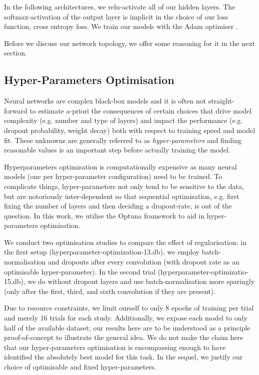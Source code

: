\documentclass[british,12p]{article}
\begin{document}
    In the following architectures, we relu-activate all of our hidden layers. The softmax-activation of the output layer is implicit in the choice of our loss function, cross entropy loss. 
    We train our models with the Adam optimiser \cite{kingma:15}.  
    
    Before we discuss our network topology, we offer some reasoning for it in the next section.

 	
    \subsection{Hyper-Parameters Optimisation}
    
    Neural networks are complex black-box models and it is often not straight-forward to estimate a-priori the consequences of certain choices that drive model complexity (e.g. number and type of layers) and impact the performance (e.g. dropout probability, weight decay) both with respect to training speed and model fit. These unknowns are generally referred to as \textit{hyper-parameters} and finding reasonable values is an important step before actually training the model.
    
    Hyperparameters optimisation is computationally expensive as many neural models (one per hyper-parameter configuration) need to be trained. To complicate things, hyper-parameters not only tend to be sensitive to the data, but are notoriously inter-dependent so that sequential optimisation, e.g. first fixing the number of layers and then deciding a dropout-rate, is out of the question. In this work, we utilise the Optuna framework \cite{optuna:19} to aid in hyper-parameters optimisation. 
    
    We conduct two optimisation studies to compare the effect of regularisation: in the first setup (hyperparameter-optimization-13.db), we employ batch-normalisation and dropouts after every convolution (with dropout rate as an optimisable hyper-parameter). In the second trial (hyperparameter-optimizatio-15.db), we do without dropout layers and use batch-normalisation more sparingly (only after the first, third, and sixth convolution if they are present).  
    
    Due to resource constraints, we limit ourself to only 8 epochs of training per trial and merely 16 trials for each study. Additionally, we expose each model to only half of the available dataset; our results here are to be understood as a principle proof-of-concept to illustrate the general idea. We do not make the claim here that our hyper-parameters optimisation is encompassing enough to have identified the absolutely best model for this task. In the sequel, we justify our choice of optimisable and fixed hyper-parameters.
   
\end{document}
